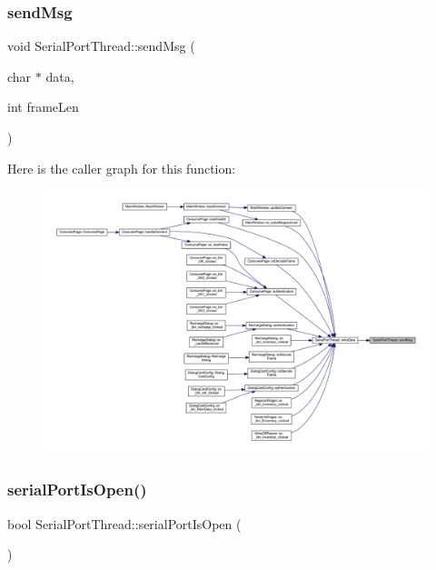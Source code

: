 \subsubsection{\texorpdfstring{sendMsg}{sendMsg}}
{\footnotesize\ttfamily void Serial\+Port\+Thread\+::send\+Msg (\begin{DoxyParamCaption}\item[{char $\ast$}]{data,  }\item[{int}]{frame\+Len }\end{DoxyParamCaption})\hspace{0.3cm}{\ttfamily [signal]}}

Here is the caller graph for this function\+:
\nopagebreak
\begin{figure}[H]
\begin{center}
\leavevmode
\includegraphics[width=350pt]{class_serial_port_thread_afe967fd379bdd7b5d7cb90292ff18c32_icgraph}
\end{center}
\end{figure}
\mbox{\label{class_serial_port_thread_abbdd068503223fcd5f3d2376eb78c50e}} 
\subsubsection{\texorpdfstring{serialPortIsOpen()}{serialPortIsOpen()}}
{\footnotesize\ttfamily bool Serial\+Port\+Thread\+::serial\+Port\+Is\+Open (\begin{DoxyParamCaption}{ }\end{DoxyParamCaption})}



